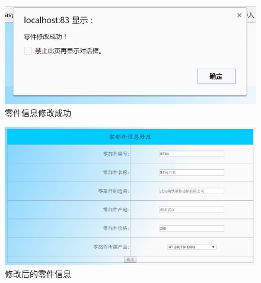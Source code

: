 \begin{figure}[H]
\centering
\includegraphics[width=0.8\linewidth]{figure/part_modify_success}
\caption{零件信息修改成功}
\label{fig:part_modify_success}
\end{figure}

\begin{figure}[H]
\centering
\includegraphics[width=0.8\linewidth]{figure/part_modify_success1}
\caption{修改后的零件信息}
\label{fig:part_modify_success1}
\end{figure}

